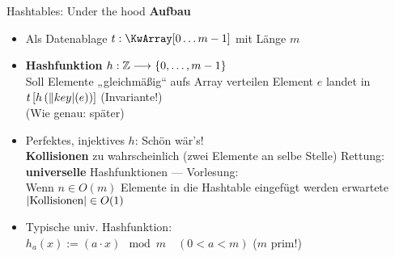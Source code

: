 \begin{frame}{Hashtables: Under the hood} 
	\textbf{Aufbau} \\
	\begin{itemize}
		\item Als Datenablage \impl $t: \KwArray[0 \dots m-1]$ mit Länge $m$
		\pause
		\item \textbf{Hashfunktion} $h: \mathbb{Z} \longrightarrow \{0, \dots, m-1\}$ \\
		Soll Elemente „gleichmäßig“ aufs Array verteilen
		\pause
		\implitem Element $e$ landet in $t\left\lbrack h\left(\|key|(e) \right)\right\rbrack$ \quad  (Invariante!) \\
		{\small (Wie genau: später)}
		\pause
		\item[\Cons] Perfektes, injektives $h$: Schön wär's! \\
		\impl \textbf{Kollisionen} zu wahrscheinlich {\small (zwei Elemente an selbe Stelle)}
		\pause
		\implitem Rettung: \zB \textbf{universelle} Hashfunktionen \quad --- \quad  Vorlesung: \\
		Wenn $n \in O(m)$ Elemente in die Hashtable eingefügt werden \impl erwartete $ \left|\text{Kollisionen}\right| \in O(1)$ 
		\pause
		\item Typische univ. Hashfunktion: \\
		$h_a(x) := (a \cdot x) \mod m \quad (0 < a < m)$ \quad ($m$ prim!)
		
	\end{itemize}
\end{frame}

